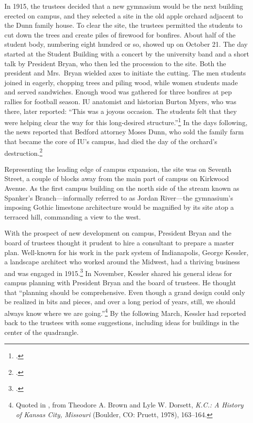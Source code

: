 \documentclass[
  american,
  letterpaper,
]{scrreprt}
\begin{document}
In 1915, the trustees decided that a new gymnasium would be the next
building erected on campus, and they selected a site in the old apple
orchard adjacent to the Dunn family house. To clear the site, the
trustees permitted the students to cut down the trees and create piles
of firewood for bonfires. About half of the student body, numbering
eight hundred or so, showed up on October 21. The day started at the
Student Building with a concert by the university band and a short talk
by President Bryan, who then led the procession to the site. Both the
president and Mrs.~Bryan wielded axes to initiate the cutting. The men
students joined in eagerly, chopping trees and piling wood, while women
students made and served sandwiches. Enough wood was gathered for three
bonfires at pep rallies for football season. IU anatomist and historian
Burton Myers, who was there, later reported: ``This was a joyous
occasion. The students felt that they were helping clear the way for
this long-desired structure.''\footnote{.} In the days
following, the news reported that Bedford attorney Moses Dunn, who sold
the family farm that became the core of IU's campus, had died the day of
the orchard's destruction.\footnote{.}

Representing the leading edge of campus expansion, the site was on
Seventh Street, a couple of blocks away from the main part of campus on
Kirkwood Avenue. As the first campus building on the north side of the
stream known as Spanker's Branch---informally referred to as Jordan
River---the gymnasium's imposing Gothic limestone architecture would be
magnified by its site atop a terraced hill, commanding a view to the
west.

With the prospect of new development on campus, President Bryan and the
board of trustees thought it prudent to hire a consultant to prepare a
master plan. Well-known for his work in the park system of Indianapolis,
George Kessler, a landscape architect who worked around the Midwest, had
a thriving business and was engaged in 1915.\footnote{.} In November,
Kessler shared his general ideas for campus planning with President
Bryan and the board of trustees. He thought that ``planning should be
comprehensive. Even though a grand design could only be realized in bits
and pieces, and over a long period of years, still, we should always
know where we are going.''\footnote{Quoted in
  , from Theodore A. Brown and Lyle W. Dorsett,
  \emph{K.C.: A History of Kansas City, Missouri} (Boulder, CO: Pruett,
  1978), 163--164.} By the following March, Kessler had reported back to
the trustees with some suggestions, including ideas for buildings in the
center of the quadrangle.
\end{document}
